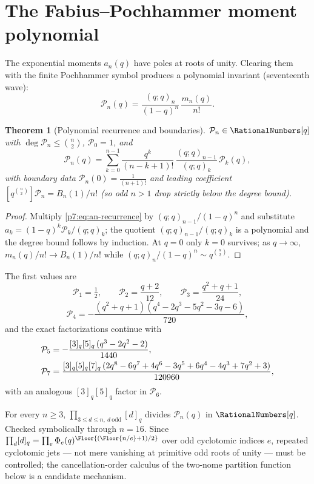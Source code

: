 \documentclass[11pt,oneside]{article}
\numberwithin{equation}{section}
\newtheorem{theorem}{Theorem}[section]
\theoremstyle{definition}
\theoremstyle{remark}
\begin{document}
\section{The Fabius--Pochhammer moment polynomial}
\label{p7:sec:moment-polynomial}

The exponential moments $a_n(q)$ have poles at roots of unity.  Clearing them
with the finite Pochhammer symbol produces a polynomial invariant
(seventeenth wave):
\begin{equation}\label{p7:eq:Pn-def}
 \boxed{\ \mathcal P_n(q)=\frac{(q;q)_n}{(1-q)^n}\,\frac{m_n(q)}{n!}.\ }
\end{equation}

\begin{theorem}[Polynomial recurrence and boundaries]
\label{p7:thm:Pn}
$\mathcal P_n\in\RationalNumbers[q]$ with $\deg\mathcal P_n\le\binom n2$,
$\mathcal P_0=1$, and
\begin{equation}\label{p7:eq:Pn-recurrence}
 \mathcal P_n(q)=
 \sum_{k=0}^{n-1}\frac{q^k}{(n-k+1)!}\,
 \frac{(q;q)_{n-1}}{(q;q)_k}\,\mathcal P_k(q),
\end{equation}
with boundary data
$\mathcal P_n(0)=\tfrac1{(n+1)!}$ and leading coefficient
$[q^{\binom n2}]\mathcal P_n=B_n(1)/n!$ (so odd $n>1$ drop strictly below the
degree bound).
\end{theorem}

\begin{proof}
Multiply \eqref{p7:eq:an-recurrence} by $(q;q)_{n-1}/(1-q)^n$ and substitute
$a_k=(1-q)^k\mathcal P_k/(q;q)_k$; the quotient
$(q;q)_{n-1}/(q;q)_k$ is a polynomial and the degree bound follows by
induction.  At $q=0$ only $k=0$ survives; as $q\to\infty$,
$m_n(q)/n!\to B_n(1)/n!$ while $(q;q)_n/(1-q)^n\sim q^{\binom n2}$.
\end{proof}

The first values are
\[
 \mathcal P_1=\tfrac12,\qquad
 \mathcal P_2=\frac{q+2}{12},\qquad
 \mathcal P_3=\frac{q^2+q+1}{24},
\]
\[
 \mathcal P_4=-\frac{(q^2+q+1)(q^4-2q^3-5q^2-3q-6)}{720},
\]
and the exact factorizations continue with
\begin{align}
 \mathcal P_5&=-\frac{[3]_q[5]_q\,(q^3-2q^2-2)}{1440},
 \notag\\
 \mathcal P_7&=\frac{[3]_q[5]_q[7]_q\,
 (2q^8-6q^7+4q^6-3q^5+6q^4-4q^3+7q^2+3)}{120960},
 \label{p7:eq:Pn-factorizations}
\end{align}
with an analogous $[3]_q[5]_q$ factor in $\mathcal P_6$.

\begin{conjecture}
\label{p7:conj:Pn-divisibility}
For every $n\ge3$,
$\prod_{3\le d\le n,\ d\ \mathrm{odd}}[d]_q$ divides $\mathcal P_n(q)$ in
$\RationalNumbers[q]$.  Checked symbolically through $n=16$.  Since
$\prod_{d}[d]_q=\prod_e\Phi_e(q)^{\Floor{(\Floor{n/e}+1)/2}}$ over odd
cyclotomic indices $e$, repeated cyclotomic jets --- not mere vanishing at
primitive odd roots of unity --- must be controlled; the cancellation-order
calculus of the two-nome partition function below is a candidate mechanism.
\end{conjecture}
\end{document}

